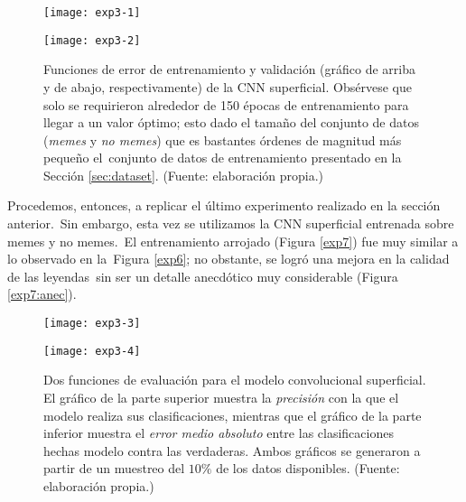
\begin{figure}[H]
  \begin{minipage}[c]{\linewidth}
    \texttt{[image: exp3-1]}
  \end{minipage}\hfill
  \begin{minipage}[c]{\linewidth}
    \texttt{[image: exp3-2]}
  \end{minipage}
  \caption{
    Funciones de error de entrenamiento y validación (gráfico de arriba y de abajo,
    respectivamente) de la CNN superficial. Obsérvese que
    solo se requirieron alrededor de 150 épocas de entrenamiento para llegar a un
    valor óptimo; esto dado el tamaño del conjunto de datos (\emph{memes} y
    \emph{no memes}) que es bastantes órdenes de magnitud más pequeño el\
    conjunto de datos de entrenamiento presentado en la Sección \ref{sec:dataset}.
    (Fuente: elaboración propia.)
  }
  \label{exp3}
\end{figure}

Procedemos, entonces, a replicar el último experimento realizado en la sección anterior.\
Sin embargo, esta vez se utilizamos la CNN superficial entrenada sobre memes y no memes.\
El entrenamiento arrojado (Figura \ref{exp7}) fue muy similar a lo observado en la\
Figura \ref{exp6}; no obstante, se logró una mejora en la calidad de las leyendas\
sin ser un detalle anecdótico muy considerable (Figura \ref{exp7:anec}).

\begin{figure}[H]
  \centering
  \begin{minipage}[c]{\linewidth}
    \texttt{[image: exp3-3]}
  \end{minipage}\hfill
  \begin{minipage}[c]{\linewidth}
    \texttt{[image: exp3-4]}
  \end{minipage}
  \caption{
    Dos funciones de evaluación para el modelo convolucional superficial.
    El gráfico de la parte superior muestra la \emph{precisión} con la que el modelo realiza
    sus clasificaciones, mientras que el gráfico de la parte inferior muestra el
    \emph{error medio absoluto} entre las clasificaciones hechas modelo contra las verdaderas.
    Ambos gráficos se generaron a partir de un muestreo del $10\%$ de los datos disponibles.
    (Fuente: elaboración propia.)
  }
  \label{eval:exp3}
\end{figure}

